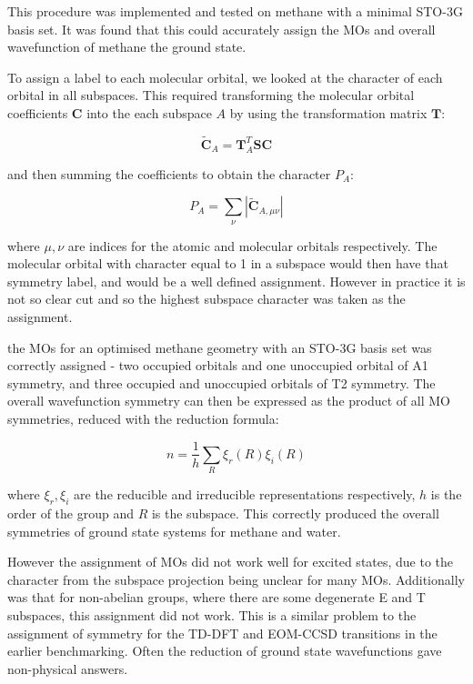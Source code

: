 This procedure was implemented and tested on methane with a minimal STO-3G basis set.
It was found that this could accurately assign the MOs and overall wavefunction of
methane the ground state.

To assign a label to each molecular orbital, we looked at the character of each
orbital in all subspaces. This required transforming the molecular orbital coefficients
$\mathbf{C}$ into the each subspace $A$ by using the transformation matrix $\mathbf{T}$:

\begin{equation}
\tilde{\mathbf{C}}_A = \mathbf{T}^T_A \mathbf{S} \mathbf{C}
\end{equation}

and then summing the coefficients to obtain the character $P_A$:

\begin{equation}
P_A = \sum_{\nu} \left\lvert \tilde{\mathbf{C}}_{A, \mu\nu} \right\lvert  
\end{equation}

where $\mu,\nu$ are indices for the atomic and molecular orbitals respectively. 
The molecular orbital with character equal to 1 in a subspace would then have that
symmetry label, and would be a well defined assignment. However in practice it is
not so clear cut and so the highest subspace character was taken as the assignment.

the MOs for an optimised methane geometry with an STO-3G basis set was correctly
assigned  - two occupied orbitals and one unoccupied orbital of A1 symmetry,
and three occupied and unoccupied orbitals of T2 symmetry. The overall wavefunction
symmetry can then be expressed as the product of all MO symmetries, reduced with
the reduction formula:

\begin{equation}
n = \frac{1}{h} \sum_R \xi_r \left( R \right) \xi_i \left( R \right)
\end{equation}

where $\xi_r, \xi_i$ are the reducible and irreducible representations respectively,
$h$ is the order of the group and $R$ is the subspace. This correctly produced
the overall symmetries of ground state systems for methane and water.

However the assignment of MOs did not work well for excited states, due to the
character from the subspace projection being unclear for many MOs. 
Additionally was that for non-abelian groups, where there are some degenerate E
and T subspaces, this assignment did not work. This is a similar problem to the
assignment of symmetry for the TD-DFT and EOM-CCSD transitions in the earlier 
benchmarking. Often the reduction of ground state wavefunctions gave non-physical answers.

